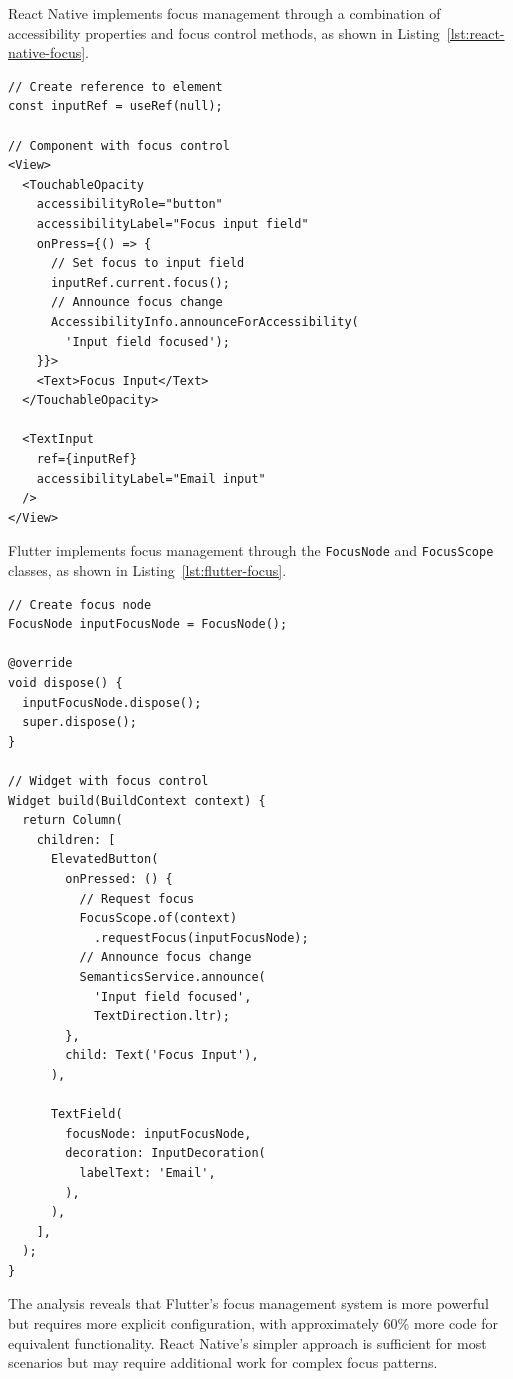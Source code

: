 {React Native implements focus management through a combination of accessibility properties and focus control methods, as shown in Listing~\ref{lst:react-native-focus}.

\begin{lstlisting}[style=ReactNativeStyle, caption=Focus management in React Native, label=lst:react-native-focus]
// Create reference to element
const inputRef = useRef(null);

// Component with focus control
<View>
  <TouchableOpacity
    accessibilityRole="button"
    accessibilityLabel="Focus input field"
    onPress={() => {
      // Set focus to input field
      inputRef.current.focus();
      // Announce focus change
      AccessibilityInfo.announceForAccessibility(
        'Input field focused');
    }}>
    <Text>Focus Input</Text>
  </TouchableOpacity>
  
  <TextInput
    ref={inputRef}
    accessibilityLabel="Email input"
  />
</View>
\end{lstlisting}

\FloatBarrier

Flutter implements focus management through the \texttt{FocusNode} and \texttt{FocusScope} classes, as shown in Listing~\ref{lst:flutter-focus}.

\begin{lstlisting}[style=DartStyle, caption=Focus management in Flutter, label=lst:flutter-focus]
// Create focus node
FocusNode inputFocusNode = FocusNode();

@override
void dispose() {
  inputFocusNode.dispose();
  super.dispose();
}

// Widget with focus control
Widget build(BuildContext context) {
  return Column(
    children: [
      ElevatedButton(
        onPressed: () {
          // Request focus
          FocusScope.of(context)
            .requestFocus(inputFocusNode);
          // Announce focus change
          SemanticsService.announce(
            'Input field focused',
            TextDirection.ltr);
        },
        child: Text('Focus Input'),
      ),
      
      TextField(
        focusNode: inputFocusNode,
        decoration: InputDecoration(
          labelText: 'Email',
        ),
      ),
    ],
  );
}
\end{lstlisting}

\pagebreak

The analysis reveals that Flutter's focus management system is more powerful but requires more explicit configuration, with approximately 60\% more code for equivalent functionality. React Native's simpler approach is sufficient for most scenarios but may require additional work for complex focus patterns.

}
